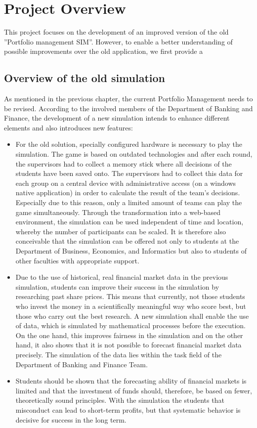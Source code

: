 \section{Project Overview}
\label{sec:project_overview}

This project focuses on the development of an improved version of the old ''Portfolio management SIM''. However, to enable a better understanding of possible improvements over the old application, we first provide a

\subsection{Overview of the old simulation}
As mentioned in the previous chapter, the current Portfolio Management needs to be revised. According to the involved members of the Department of Banking and Finance, the development of a new simulation intends to enhance different elements and also introduces new features:
\begin{itemize}
  \item For the old solution, specially configured hardware is necessary to play the simulation. The game is based on outdated technologies and after each round, the supervisors had to collect a memory stick where all decisions of the students have been saved onto. The supervisors had to collect this data for each group on a central device with administrative access (on a windows native application) in order to calculate the result of the team's decisions. Especially due to this reason, only a limited amount of teams can play the game simultaneously. Through the transformation into a web-based environment, the simulation can be used independent of time and location, whereby the number of participants can be scaled. It is therefore also conceivable that the simulation can be offered not only to students at the Department of Business, Economics, and Informatics but also to students of other faculties with appropriate support.
  \item Due to the use of historical, real financial market data in the previous simulation, students can improve their success in the simulation by researching past share prices. This means that currently, not those students who invest the money in a scientifically meaningful way who score best, but those who carry out the best research. A new simulation shall enable the use of data, which is simulated by mathematical processes before the execution. On the one hand, this improves fairness in the simulation and on the other hand, it also shows that it is not possible to forecast financial market data precisely. The simulation of the data lies within the task field of the Department of Banking and Finance Team.
  \item Students should be shown that the forecasting ability of financial markets is limited and that the investment of funds should, therefore, be based on fewer, theoretically sound principles. With the simulation the students that misconduct can lead to short-term profits, but that systematic behavior is decisive for success in the long term.
\end{itemize}

